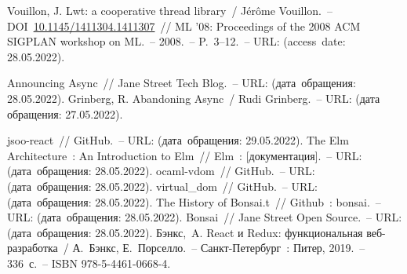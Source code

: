 \begin{thebibliography}{00}
      Vouillon, J. Lwt: a cooperative thread library~/
      Jérôme Vouillon.~--
  DOI~\href{https://doi.org/10.1145/1411304.1411307}{10.1145/1411304.1411307}~//
  ML '08: Proceedings of the 2008 ACM SIGPLAN workshop on ML.~--
  2008.~-- P.~3--12.~--
  URL: \underline{}
  (access~date: 28.05.2022).
  
      Announcing Async~// Jane Street Tech Blog.~--
      URL: \underline{}
      (дата~обращения: 28.05.2022). 
      Grinberg, R. Abandoning Async~/ Rudi Grinberg.~--
      URL: \underline{}
      (дата обращения: 27.05.2022).
    
      jsoo-react~// GitHub.~--
      URL: \underline{}
      (дата~обращения: 29.05.2022). 
      The Elm Architecture~: An Introduction to Elm~// Elm~: [документация].~--
      URL: \underline{}
      (дата~обращения: 28.05.2022). 
      ocaml-vdom~// GitHub.~--
      URL: \underline{}
      (дата~обращения: 28.05.2022). 
      virtual\_dom~// GitHub.~--
      URL: \underline{}
      (дата~обращения: 28.05.2022). 
      The History of Bonsai.t~// Github~: bonsai.~--
      URL: \underline{}
      (дата~обращения: 28.05.2022). 
      Bonsai~// Jane Street Open Source.~--
      URL: \underline{}
      (дата~обращения: 28.05.2022). 
      Бэнкс,~A. React и Redux: функциональная веб-разработка~/ А.~Бэнкс, Е.~Порселло.~--
      Санкт-Петербург~: Питер, 2019.~--
      336~с.~--
      ISBN 978-5-4461-0668-4.
    

\end{thebibliography}
